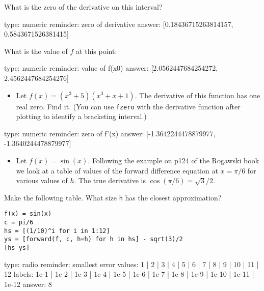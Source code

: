 \documentclass[12pt]{article}
\begin{document}
What is the zero of the derivative on this interval?

\begin{answer}
    type: numeric
    reminder: zero of derivative
    answer: [0.18436715263814157, 0.5843671526381415]

\end{answer}

What is the value of $f$ at this point:

\begin{answer}
    type: numeric
    reminder: value of f(x0)
    answer: [2.0562447684254272, 2.4562447684254276]

\end{answer}

\begin{itemize}
\itemsep1pt\parskip0pt
\item
  Let $f(x) = (x^3 + 5)(x^3 + x + 1)$. The derivative of this function
  has one real zero. Find it. (You can use \texttt{fzero} with the
  derivative function after plotting to identify a bracketing interval.)
\end{itemize}

\begin{answer}
    type: numeric
    reminder: zero of f'(x)
    answer: [-1.3642244478879977, -1.3640244478879977]

\end{answer}

\begin{itemize}
\itemsep1pt\parskip0pt
\item
  Let $f(x) = \sin(x)$. Following the example on p124 of the Rogawski
  book we look at a table of values of the forward difference equation
  at $x=\pi/6$ for various values of $h$. The true derivative is
  $\cos(\pi/6) = \sqrt{3}/2$.
\end{itemize}

Make the following table. What size \texttt{h} has the closest
approximation?



\begin{verbatim}
f(x) = sin(x)
c = pi/6
hs = [(1/10)^i for i in 1:12]
ys = [forward(f, c, h=h) for h in hs] - sqrt(3)/2
[hs ys]
\end{verbatim}
\begin{answer}
type: radio
reminder: smallest error
values: 1 | 2 | 3 | 4 | 5 | 6 | 7 | 8 | 9 | 10 | 11 | 12
labels: 1e-1 | 1e-2 | 1e-3 | 1e-4 | 1e-5 | 1e-6 | 1e-7 | 1e-8 | 1e-9 | 1e-10 | 1e-11 | 1e-12
answer: 8
\end{answer}
\end{document}
